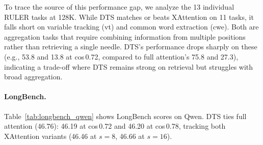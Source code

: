 \begin{table}[!ht]
\centering
\caption{RULER accuracy (\%) comparing DTS with the other baselines on Qwen2.5-7B-Instruct-1M. Best score per column in \textbf{bold}. The DTS row is measured under the corrected scoring kernel; cos\,0.72 was not re-run under it and is omitted.}
\label{tab:delta_tile_scoring_qwen}
\end{table}

To trace the source of this performance gap, we analyze the 13 individual RULER tasks at 128K. While DTS matches or beats XAttention on 11 tasks, it falls short on variable tracking (vt) and common word extraction (cwe). Both are aggregation tasks that require combining information from multiple positions rather than retrieving a single needle. DTS's performance drops sharply on these (e.g., 53.8 and 13.8 at cos\,0.72, compared to full attention's 75.8 and 27.3), indicating a trade-off where DTS remains strong on retrieval but struggles with broad aggregation.

\paragraph{LongBench.}

Table~\ref{tab:longbench_qwen} shows LongBench scores on Qwen. DTS ties full attention (46.76): 46.19 at cos\,0.72 and 46.20 at cos\,0.78, tracking both XAttention variants (46.46 at $s{=}8$, 46.66 at $s{=}16$).


